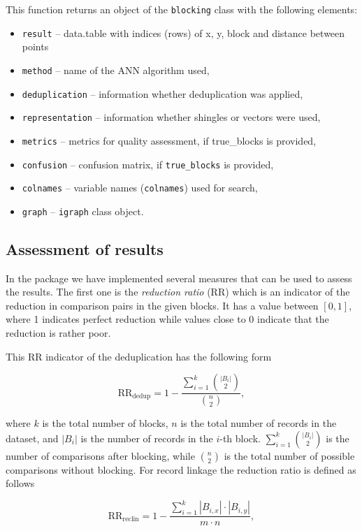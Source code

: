 This function returns an object of the \texttt{blocking} class with the
following elements:

\begin{itemize}
\tightlist
\item
  \texttt{result} -- data.table with indices (rows) of x, y, block and
  distance between points
\item
  \texttt{method} -- name of the ANN algorithm used,
\item
  \texttt{deduplication} -- information whether deduplication was applied,
\item
  \texttt{representation} -- information whether shingles or vectors were
  used,
\item
  \texttt{metrics} -- metrics for quality assessment, if true\_blocks is
  provided,
\item
  \texttt{confusion} -- confusion matrix, if \texttt{true\_blocks} is provided,
\item
  \texttt{colnames} -- variable names (\texttt{colnames}) used for search,
\item
  \texttt{graph} -- \texttt{igraph} class object.
\end{itemize}

\subsection{Assessment of results}\label{sec-assess}

In the package we have implemented several measures that can be used to
assess the results. The first one is the \emph{reduction ratio} (RR) which is
an indicator of the reduction in comparison pairs in the given blocks.
It has a value between \([0,1]\), where 1 indicates perfect reduction
while values close to 0 indicate that the reduction is rather poor.

This RR indicator of the deduplication has the following form

\[
\text{RR}_{\text{dedup}} = 1 - \frac{\sum\limits_{i=1}^{k} \binom{|B_i|}{2}}{\binom{n}{2}},
\]

\noindent where \(k\) is the total number of blocks, \(n\) is the total
number of records in the dataset, and \(|B_i|\) is the number of records
in the \(i\)-th block. \(\sum\limits_{i=1}^{k} \binom{|B_i|}{2}\) is the
number of comparisons after blocking, while \(\binom{n}{2}\) is the total
number of possible comparisons without blocking. For record linkage the
reduction ratio is defined as follows

\[
\text{RR}_{\text{reclin}} = 1 - \frac{\sum\limits_{i=1}^{k} |B_{i,x}| \cdot |B_{i,y}|} {m \cdot n},
\]

